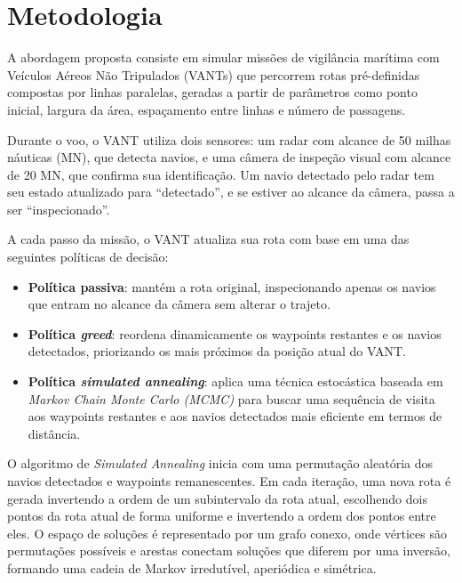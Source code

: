 
\section{Metodologia}

A abordagem proposta consiste em simular missões de vigilância marítima com Veículos Aéreos Não Tripulados (VANTs) que percorrem rotas pré-definidas compostas por linhas paralelas, geradas a partir de parâmetros como ponto inicial, largura da área, espaçamento entre linhas e número de passagens.

Durante o voo, o VANT utiliza dois sensores: um radar com alcance de 50 milhas náuticas (MN), que detecta navios, e uma câmera de inspeção visual com alcance de 20 MN, que confirma sua identificação. Um navio detectado pelo radar tem seu estado atualizado para ``detectado'', e se estiver ao alcance da câmera, passa a ser ``inspecionado''.

A cada passo da missão, o VANT atualiza sua rota com base em uma das seguintes políticas de decisão:

\begin{itemize}
    \item \textbf{Política passiva}: mantém a rota original, inspecionando apenas os navios que entram no alcance da câmera sem alterar o trajeto.
    \item \textbf{Política \textit{greed}}: reordena dinamicamente os waypoints restantes e os navios detectados, priorizando os mais próximos da posição atual do VANT.
    \item \textbf{Política \textit{simulated annealing}}: aplica uma técnica estocástica baseada em \textit{Markov Chain Monte Carlo (MCMC)} para buscar uma sequência de visita aos waypoints restantes e aos navios detectados mais eficiente em termos de distância.
\end{itemize}

O algoritmo de \textit{Simulated Annealing} inicia com uma permutação aleatória dos navios detectados e waypoints remanescentes. Em cada iteração, uma nova rota é gerada invertendo a ordem de um subintervalo da rota atual, escolhendo dois pontos da rota atual de forma uniforme e invertendo a ordem dos pontos entre eles. O espaço de soluções é representado por um grafo conexo, onde vértices são permutações possíveis e arestas conectam soluções que diferem por uma inversão, formando uma cadeia de Markov irredutível, aperiódica e simétrica.

